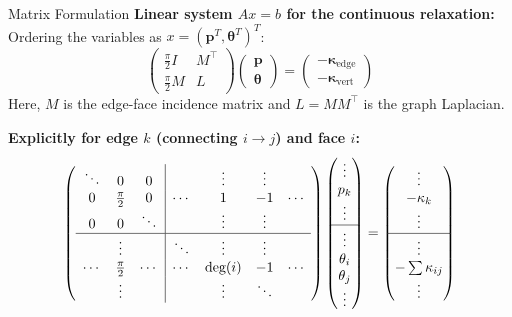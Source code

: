 \documentclass[aspectratio=169]{beamer}
\begin{document}
\begin{frame}{Matrix Formulation}
\textbf{Linear system $Ax=b$ for the continuous relaxation:}
Ordering the variables as $x = (\mathbf{p}^T, \mathbf{\theta}^T)^T$:
\[  
\begin{pmatrix}
    \frac{\pi}{2} I & M^\top \\
    \frac{\pi}{2} M & L
\end{pmatrix} 
\begin{pmatrix}
    \mathbf{p} \\ \mathbf{\theta}
\end{pmatrix} = 
\begin{pmatrix}
    -\mathbf{\kappa}_{\text{edge}} \\ -\mathbf{\kappa}_{\text{vert}}
\end{pmatrix}
\]
Here, $M$ is the edge-face incidence matrix and $L = M M^\top$ is the graph Laplacian.

\vspace{0.2cm}
\footnotesize
\textbf{Explicitly for edge $k$ (connecting $i \to j$) and face $i$:}
\[
\left(
\begin{array}{ccc|ccccc}
    \ddots & 0 & 0 & & \vdots & \vdots & \\
    0 & \frac{\pi}{2} & 0 & \cdots & 1 & -1 & \cdots \\
    0 & 0 & \ddots & & \vdots & \vdots & \\
    \hline
    & \vdots & & \ddots & \vdots & \vdots & \\
    \cdots & \frac{\pi}{2} & \cdots & \cdots & \text{deg}(i) & -1 & \cdots \\
    & \vdots & & & \vdots & \ddots & 
\end{array}
\right)
\begin{pmatrix}
    \vdots \\ p_{k} \\ \vdots \\ \hline \vdots \\ \theta_i \\ \theta_j \\ \vdots
\end{pmatrix} = 
\begin{pmatrix}
    \vdots \\ -\kappa_{k} \\ \vdots \\ \hline \vdots \\ -\sum \kappa_{ij} \\ \vdots
\end{pmatrix}
\]
\end{frame}
\end{document}
